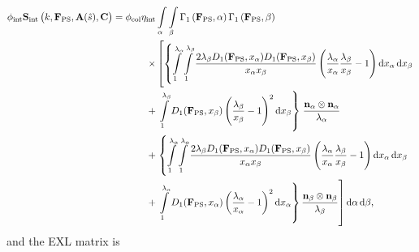 \begin{equation} \label{eq:fullinteractions}
\begin{split}
\phi_\mathrm{int}\mathbf{S}_\mathrm{int}\left(k , \mathbf{F}_\mathrm{PS}, \mathbf{A}(\hat{s}), \mathbf{C}\right) = \phi_\mathrm{col} \eta_\mathrm{int}& \int\displaylimits_\alpha \int\displaylimits_\beta \Gamma_1 \left(\mathbf{F}_\mathrm{PS}, \alpha \right) \Gamma_1 \left(\mathbf{F}_\mathrm{PS},  \beta \right) \\
\times&\left[ \left\lbrace 
\int\displaylimits_1^{\lambda_\alpha} \int\displaylimits_1^{\lambda_\beta} 
\frac{2 \lambda_\beta D_1(\mathbf{F}_\mathrm{PS}, x_\alpha) D_1(\mathbf{F}_\mathrm{PS}, x_\beta)}{x_\alpha x_\beta} 
\left( \frac{\lambda_\alpha}{x_\alpha} \frac{\lambda_\beta}{x_\beta} - 1\right) \mathrm{d}x_\alpha \, \mathrm{d}x_\beta \right.\right. \\
+& \left. \left. \int\displaylimits_1^{\lambda_\beta} D_1(\mathbf{F}_\mathrm{PS}, x_\beta) \left( \frac{\lambda_\beta}{x_\beta} -1  \right)^2 \mathrm{d}x_\beta \right\rbrace \right.  \frac{\mathbf{n}_\alpha \otimes \mathbf{n}_\alpha}{\lambda_\alpha}  \\
+& \left. \left\lbrace
\int\displaylimits_1^{\lambda_\alpha} \int\displaylimits_1^{\lambda_\alpha} 
\frac{2 \lambda_\beta D_1(\mathbf{F}_\mathrm{PS}, x_\alpha) D_1(\mathbf{F}_\mathrm{PS}, x_\beta)}{x_\alpha x_\beta} 
\left( \frac{\lambda_\alpha}{x_\alpha} \frac{\lambda_\beta}{x_\beta} - 1\right) \mathrm{d}x_\alpha \, \mathrm{d}x_\beta 
\right. \right. \\
+&\left. \left. \int\displaylimits_1^{\lambda_\alpha} D_1(\mathbf{F}_\mathrm{PS}, x_\alpha) \left( \frac{\lambda_\alpha}{x_\alpha} -1  \right)^2 \mathrm{d}x_\alpha \right\rbrace \frac{\mathbf{n}_\beta \otimes \mathbf{n}_\beta}{\lambda_\beta}  \right] \mathrm{d}\alpha \, \mathrm{d}\beta,
\end{split}
\end{equation}
and the EXL matrix is
